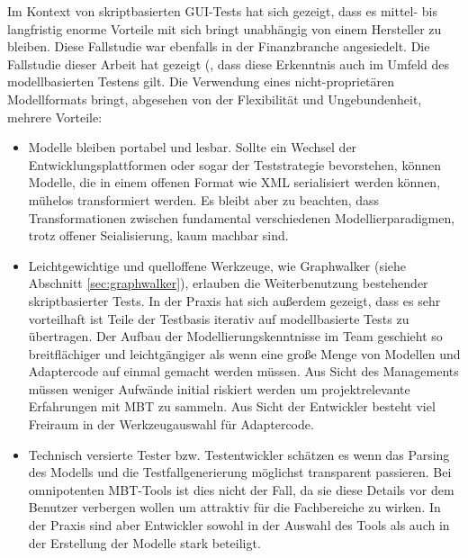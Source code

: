 Im Kontext von skriptbasierten GUI-Tests hat sich gezeigt, dass es mittel- bis langfristig enorme Vorteile mit sich bringt unabhängig von einem Hersteller zu bleiben. Diese Fallstudie war ebenfalls in der Finanzbranche angesiedelt\cite{graham_experiences_2012}. Die Fallstudie dieser Arbeit hat gezeigt (, dass diese Erkenntnis auch im Umfeld des modellbasierten Testens gilt. Die Verwendung eines nicht-proprietären Modellformats bringt, abgesehen von der Flexibilität und Ungebundenheit, mehrere Vorteile:

\begin{itemize}
\item Modelle bleiben portabel und lesbar. Sollte ein Wechsel der Entwicklungsplattformen oder sogar der Teststrategie bevorstehen, können Modelle, die in einem offenen Format wie XML serialisiert werden können, mühelos transformiert werden. Es bleibt aber zu beachten, dass Transformationen zwischen fundamental verschiedenen Modellierparadigmen, trotz offener Seialisierung, kaum machbar sind.
\item Leichtgewichtige und quelloffene Werkzeuge, wie Graphwalker (siehe Abschnitt \ref{sec:graphwalker}), erlauben die Weiterbenutzung bestehender skriptbasierter Tests. In der Praxis hat sich außerdem gezeigt, dass es sehr vorteilhaft ist Teile der Testbasis iterativ auf modellbasierte Tests zu übertragen. Der Aufbau der Modellierungskenntnisse im Team geschieht so breitflächiger und leichtgängiger als wenn eine große Menge von Modellen und Adaptercode auf einmal gemacht werden müssen. Aus Sicht des Managements müssen weniger Aufwände initial riskiert werden um projektrelevante Erfahrungen mit MBT zu sammeln. Aus Sicht der Entwickler besteht viel Freiraum in der Werkzeugauswahl für Adaptercode.
\item Technisch versierte Tester bzw. Testentwickler schätzen es wenn das Parsing des Modells und die Testfallgenerierung möglichst transparent passieren. Bei omnipotenten MBT-Tools ist dies nicht der Fall, da sie diese Details vor dem Benutzer verbergen wollen um attraktiv für die Fachbereiche zu wirken. In der Praxis sind aber Entwickler sowohl in der Auswahl des Tools als auch in der Erstellung der Modelle stark beteiligt.
\end{itemize}

\fi\makeatother